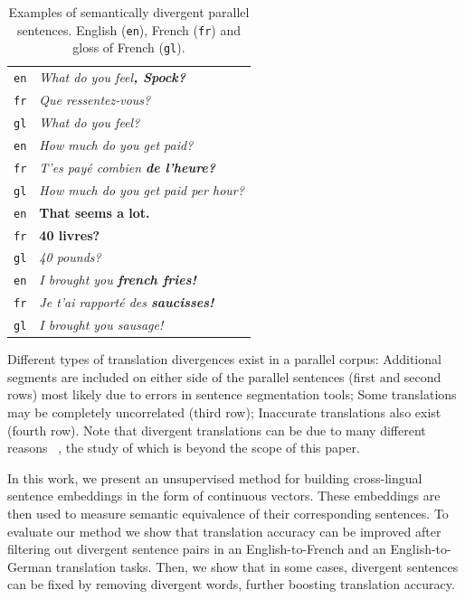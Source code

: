 \documentclass[11pt,a4paper]{article}
\begin{document}
\begin{table}[ht]
\small
\center
\begin{tabular}{ c|l }
  \hline  
  \texttt{en} & \it{What do you feel}\bf{, Spock}\it{?} \\
  \texttt{fr} & \it{Que ressentez-vous?} \\
  \texttt{gl} & {\small \it{What do you feel?}} \\
  \hline
  \texttt{en} & \it{How much do you get paid?} \\
  \texttt{fr} & \it{T'es pay\'e combien} \bf{de l'heure}\it{?} \\
  \texttt{gl} & {\small \it{How much do you get paid per hour?}} \\
  \hline  
  \texttt{en} &  \bf{That seems a lot.} \\
  \texttt{fr} & \bf{40 livres?} \\
  \texttt{gl} & {\small \it{40 pounds?}} \\
  \hline  
  \texttt{en} & \it{I brought you} \bf{french fries}\it{!} \\
  \texttt{fr} & \it{Je t'ai rapport\'e des} \bf{saucisses}\it{!} \\
  \texttt{gl} & {\small \it{I brought you sausage!}} \\
  \hline
\end{tabular}
\caption[Table caption text]{Examples of semantically divergent parallel sentences. English (\texttt{en}), French (\texttt{fr}) and gloss of French (\texttt{gl}).}
\label{tab:examples}
\end{table}

Different types of translation divergences exist in a parallel corpus:
Additional segments are included on either side of the parallel sentences (first and second rows) most likely due to errors in sentence segmentation tools;
Some translations may be completely uncorrelated (third row);
Inaccurate translations also exist (fourth row). 
Note that divergent translations can be due to many different reasons ~\cite{C14-1055}, the study of which is beyond the scope of this paper. 

In this work, we present an unsupervised method for building cross-lingual sentence embeddings in the form of continuous vectors. 
These embeddings are then used to measure semantic equivalence of their corresponding sentences.
To evaluate our method we show that translation accuracy can be improved after filtering out divergent sentence pairs in an English-to-French and an English-to-German translation tasks.
Then, we  show that in some cases, divergent sentences can be fixed by removing divergent words, further boosting translation accuracy.
\end{document}
